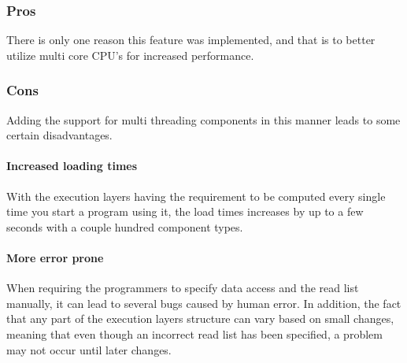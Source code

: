 \subsubsection{Pros}
There is only one reason this feature was implemented, and that is to better utilize multi core CPU's for increased performance.

\subsubsection{Cons}
Adding the support for multi threading components in this manner leads to some certain disadvantages.

\paragraph{Increased loading times}
With the execution layers having the requirement to be computed every single time you start a program using it, the load times increases by up to a few seconds with a couple hundred component types.

\paragraph{More error prone} 
When requiring the programmers to specify data access and the read list manually, it can lead to several bugs caused by human error.
In addition, the fact that any part of the execution layers structure can vary based on small changes, meaning that even though an incorrect read list has been specified, a problem may not occur until later changes.
